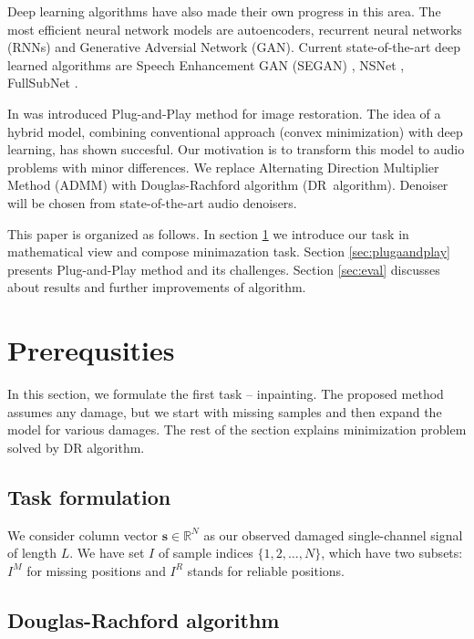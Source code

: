 \documentclass[conference]{IEEEtran}
\begin{document}
Deep learning algorithms have also made their own progress in this area.
The most efficient neural network models are autoencoders,
recurrent neural networks (RNNs) and
Generative Adversial Network (GAN).
Current state-of-the-art deep learned algorithms are Speech Enhancement GAN (SEGAN) \cite{Pascual2017}, NSNet \cite{Xia2020}, FullSubNet \cite{Hao2021}. 

In \cite{Chan2016} was introduced Plug-and-Play method for image restoration.
The idea of a hybrid model,
combining conventional approach (convex minimization) with deep learning,
has shown succesful.
Our motivation is to transform this model to audio problems with minor differences.
We replace Alternating Direction Multiplier Method (ADMM) with Douglas-Rachford algorithm (DR~algorithm).
Denoiser will be chosen from state-of-the-art audio denoisers. 

This paper is organized as follows. In section \ref{sec:prereq} we introduce our task in mathematical view and compose minimazation task.
Section \ref{sec:plugaandplay}  presents Plug-and-Play method and its challenges.
Section \ref{sec:eval} discusses about results and further improvements of algorithm.

\section{Prerequsities}\label{sec:prereq} 

In this section, we formulate the first task -- inpainting.
The proposed method \cite{Chan2016} assumes any damage,
but we start with missing samples and then expand the model for various damages.
The rest of the section explains minimization problem solved by DR algorithm.

\subsection{Task formulation}

We consider column vector $ \mathbf{s} \in \mathbb{R}^{N} $ as our observed damaged single-channel signal of length $ L $.
We have set $ I $ of sample indices $ \{1,2,\dots,N\} $, which have two subsets: $ I^M $ for missing positions and $ I^R $ stands for reliable positions.



\subsection{Douglas-Rachford algorithm}
\end{document}
